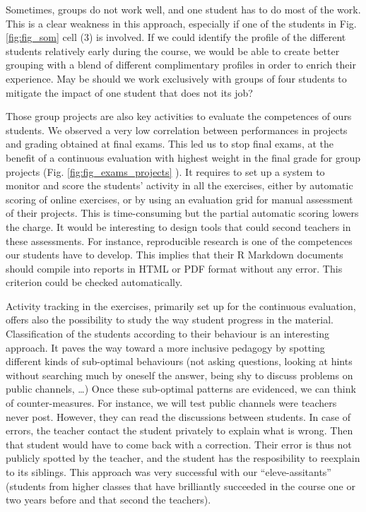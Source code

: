 \documentclass[
]{article}
\begin{document}
Sometimes, groups do not work well, and one student has to do most of
the work. This is a clear weakness in this approach, especially if one
of the students in Fig. \ref{fig:fig_som} cell (3) is involved. If we
could identify the profile of the different students relatively early
during the course, we would be able to create better grouping with a
blend of different complimentary profiles in order to enrich their
experience. May be should we work exclusively with groups of four
students to mitigate the impact of one student that does not its job?

Those group projects are also key activities to evaluate the competences
of ours students. We observed a very low correlation between
performances in projects and grading obtained at final exams. This led
us to stop final exams, at the benefit of a continuous evaluation with
highest weight in the final grade for group projects (Fig.
\ref{fig:fig_exams_projects} ). It requires to set up a system to
monitor and score the students' activity in all the exercises, either by
automatic scoring of online exercises, or by using an evaluation grid
for manual assessment of their projects. This is time-consuming but the
partial automatic scoring lowers the charge. It would be interesting to
design tools that could second teachers in these assessments. For
instance, reproducible research is one of the competences our students
have to develop. This implies that their R Markdown documents should
compile into reports in HTML or PDF format without any error. This
criterion could be checked automatically.

Activity tracking in the exercises, primarily set up for the continuous
evaluation, offers also the possibility to study the way student
progress in the material. Classification of the students according to
their behaviour is an interesting approach. It paves the way toward a
more inclusive pedagogy by spotting different kinds of sub-optimal
behaviours (not asking questions, looking at hints without searching
much by oneself the answer, being shy to discuss problems on public
channels, \ldots) Once these sub-optimal patterns are evidenced, we can
think of counter-measures. For instance, we will test public channels
were teachers never post. However, they can read the discussions between
students. In case of errors, the teacher contact the student privately
to explain what is wrong. Then that student would have to come back with
a correction. Their error is thus not publicly spotted by the teacher,
and the student has the resposibility to reexplain to its siblings. This
approach was very successful with our ``eleve-assitants'' (students from
higher classes that have brilliantly succeeded in the course one or two
years before and that second the teachers).
\end{document}
